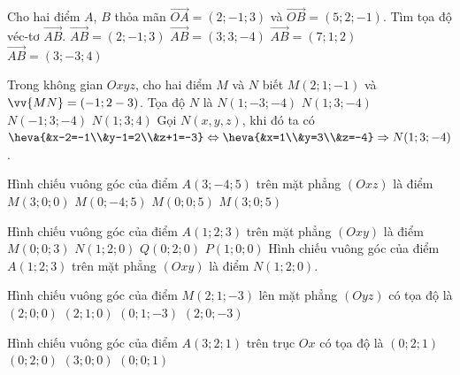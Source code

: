 \begin{ex}
	Cho hai điểm $A$, $B$ thỏa mãn $\vec{OA} = (2;-1; 3)$ và  $\vec{OB}= (5;2;-1)$. Tìm tọa độ véc-tơ $\vec{AB}$.
	\choice
	{$\vec{AB} =(2;-1;3)$}
	{\True  $\vec{AB} =(3;3;-4)$}
	{$\vec{AB} = (7;1;2)$}
	{$\vec{AB} =(3;-3;4)$}
\end{ex} 

\begin{ex}
	Trong không gian $Oxyz$, cho hai điểm $M$ và $N$ biết $M(2;1;-1)$ và $\vv{MN}=(-1;2-3)$. Tọa độ $N$ là
	\choice
	{$N(1;-3;-4)$}
	{\True $N(1;3;-4)$}
	{$N(-1;3;-4)$}
	{$N(1;3;4)$}
	\loigiai
	{
		Gọi $N(x,y,z)$, khi đó ta có $\heva{&x-2=-1\\&y-1=2\\&z+1=-3}\Leftrightarrow \heva{&x=1\\&y=3\\&z=-4}\Rightarrow N(1;3;-4)$.\\
	}
\end{ex} 

\begin{ex}
	Hình chiếu vuông góc của điểm $A(3;-4;5)$ trên mặt phẳng $(Oxz)$ là điểm
	\choice
	{$M(3;0;0)$}
	{$M(0;-4;5)$}
	{$M(0;0;5)$}
	{\True $M(3;0;5)$}
\end{ex} 

\begin{ex}
	Hình chiếu vuông góc của điểm $A(1;2;3)$ trên mặt phẳng $(Oxy)$ là điểm
	\choice
	{$M(0;0;3)$}
	{\True $N(1;2;0)$}
	{$Q(0;2;0)$}
	{$P(1;0;0)$}
	\loigiai
	{
		Hình chiếu vuông góc của điểm $A(1;2;3)$ trên mặt phẳng $(Oxy)$ là điểm $N(1;2;0)$.
	}
\end{ex} 

\begin{ex}
	Hình chiếu vuông góc của điểm $M(2;1;-3)$ lên mặt phẳng $(Oyz)$ có tọa độ là
	\choice
	{$(2;0;0)$}
	{$(2;1;0)$}
	{\True $(0;1;-3)$}
	{$(2;0;-3)$}
\end{ex} 

\begin{ex}
	Hình chiếu vuông góc của điểm $A(3;2;1)$ trên trục $Ox$ có tọa độ là
	\choice
	{$(0;2;1)$}
	{$(0;2;0)$}
	{\True $(3;0;0)$}
	{$(0;0;1)$}
\end{ex} 

